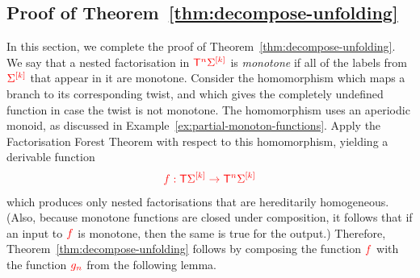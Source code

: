 \subsection{Proof of Theorem~\ref{thm:decompose-unfolding}}
\label{sec:monotone-unfold-proof}
In this section, we complete the proof of Theorem~\ref{thm:decompose-unfolding}.  We say that a nested factorisation in ${\color{red}{\mathsf T}}^{{\color{red}{n}}} {\color{red}{\Sigma}}^{{\color{red}{[k]}}}$ is \emph{monotone} if all of the labels from ${\color{red}{\Sigma}}^{{\color{red}{[k]}}}$ that appear in it are monotone. 
Consider the homomorphism which maps a branch to its corresponding twist, and which gives the completely undefined function in case the twist is not monotone.  The homomorphism uses an aperiodic monoid, as discussed in Example~\ref{ex:partial-monoton-functions}. 
 Apply the Factorisation Forest Theorem with respect to this homomorphism, yielding a derivable function
\begin{align*}
{\color{red}{ f : {\color{red}{\mathsf T}}{\color{red}{\Sigma}}^{{\color{red}{[k]}}} \to {\color{red}{\mathsf T}}^{{\color{red}{n}}} {\color{red}{\Sigma}}^{{\color{red}{[k]}}}}}
\end{align*}
which produces only nested factorisations that are  hereditarily homogeneous. (Also, because monotone functions are closed under composition, it follows that if  an input to ${\color{red}{f}}$ is monotone, then the same is true for the output.) Therefore,  Theorem~\ref{thm:decompose-unfolding} follows by composing the function ${\color{red}{f}}$ with the function ${\color{red}{g_n}}$ from the following lemma. 

